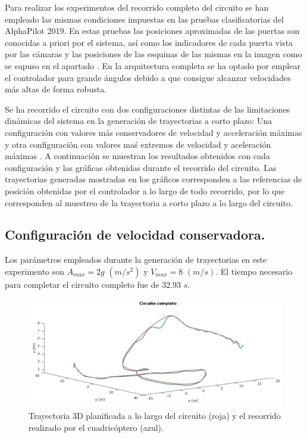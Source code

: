 Para realizar los experimentos del recorrido completo del circuito se han empleado las mismas condiciones impuestas en las pruebas clasificatorias del AlphaPilot 2019. En estas pruebas las posiciones aproximadas de las puertas son conocidas a priori por el sistema, así como los indicadores de cada puerta vista por las cámaras y las posiciones de las esquinas de las mismas en la imagen como se supuso en el apartado .
En la arquitectura completa se ha optado por emplear el controlador para grande ángulos debido a que consigue alcanzar velocidades más altas de forma robusta. 

Se ha recorrido el circuito con dos configuraciones distintas de las limitaciones dinámicas del sistema en la generación de trayectorias a corto plazo: Una configuración con valores más conservadores de velocidad y acceleración máximas y otra configuración con valores maś extremos de velocidad y aceleración máximas . A continuación se muestran los resultados obtenidos con cada configuración y las gráficas obtenidas durante el recorrido del circuito. Las trayectorias generadas mostradas en los gráficos corresponden a las referencias de posición obtenidas por el controlador a lo largo de todo recorrido, por lo que corresponden al muestreo de la trayectoria a corto plazo a lo largo del circuito.

\subsection{Configuración de velocidad conservadora.}

Los parámetros empleados durante la generación de trayectorias en este experimento son $A_{max} = 2g $ $(m/s^2)$ y $V_{max} = 8$ $(m/s)$. El tiempo necesario para completar el circuito completo fue de 32.93 $s$.
\vspace{2cm}
\begin{figure}[htb!]
	\centering
	\includegraphics[width=\textwidth]{imagenes/circuitFigure}
	\caption{Trayectoria 3D planificada a lo largo del circuito (roja) y el recorrido realizado por el cuadricóptero (azul).}
	\label{exp1:1}
\end{figure}

